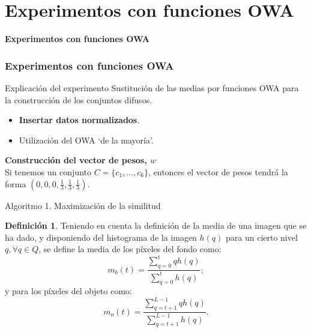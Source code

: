\documentclass{beamer}
\theoremstyle{plain} %
\theoremstyle{definition}
\newtheorem{defn}{Definición}
\newcommand{\bb}{\bfseries}
\begin{document}
\section{Experimentos con funciones OWA}
\begin{frame}
  \bfseries\Large\centering  Experimentos con funciones OWA
\end{frame}

\begin{frame}
  \frametitle{Experimentos con funciones OWA}
    \begin{block}{Explicación del experimento}
    Sustitución de las medias por funciones OWA para la construcción de los conjuntos difusos.
  \end{block}
  \begin{itemize}
    \item {\bb Insertar datos normalizados}.
    \item Utilización del OWA `de la mayoría'.
  \end{itemize}
  \begin{block}{}
  {\bb Construcción del vector de pesos, $w$}\\
  Si tenemos un conjunto $C=\{c_1,\dots,c_6\}$, entonces el vector de pesos tendrá la forma $(0,0,0,\frac{1}{3},\frac{1}{3},\frac{1}{3})$.
  \end{block}
\end{frame}

\begin{frame}{Algoritmo 1. Maximización de la similitud}
  \begin{defn}\label{def:mediasmonoumbral}
Teniendo en cuenta la definición de la media de una imagen que se ha dado, y disponiendo del histograma de la imagen $h(q)$ para un cierto nivel $q, \forall q\in Q$, se define la media de los píxeles del fondo como:
$$m_b(t)=\frac{\sum_{q=0}^{t}qh(q)}{\sum_{q=0}^{t}h(q)};$$
y para los píxeles del objeto como:
$$m_o(t)=\frac{\sum_{q=t+1}^{L-1}qh(q)}{\sum_{q=t+1}^{L-1}h(q)}.$$
\end{defn}
\end{frame}
\end{document}

